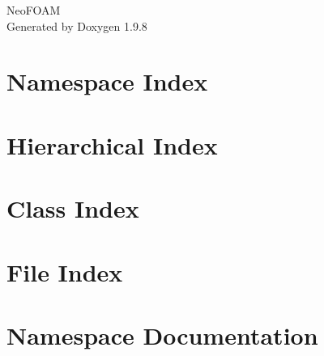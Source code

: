 \documentclass[twoside]{book}
\newcommand{\+}{\discretionary{\mbox{\scriptsize$\hookleftarrow$}}{}{}}
\newcommand{\clearemptydoublepage}{%
    \newpage{\pagestyle{empty}\cleardoublepage}%
  }
\begin{document}
  \raggedbottom
    \hypersetup{pageanchor=false,
                bookmarksnumbered=true,
                pdfencoding=unicode
               }
  \begin{titlepage}
  \vspace*{7cm}
  \begin{center}%
  {\Large Neo\+FOAM}\\
  \vspace*{1cm}
  {\large Generated by Doxygen 1.9.8}\\
  \end{center}
  \end{titlepage}
  \clearemptydoublepage
  \tableofcontents
  \clearemptydoublepage
  \hypersetup{pageanchor=true}
\chapter{Namespace Index}

\chapter{Hierarchical Index}

\chapter{Class Index}

\chapter{File Index}

\chapter{Namespace Documentation}









\end{document}
